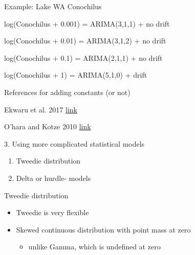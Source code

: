 \documentclass[ignorenonframetext,]{beamer}
\providecommand{\tightlist}{%
  \setlength{\itemsep}{0pt}\setlength{\parskip}{0pt}}
\begin{document}
\begin{frame}{Example: Lake WA Conochilus}

log(Conochilus + 0.001) = ARIMA(3,1,1) + no drift

log(Conochilus + 0.01) = ARIMA(3,1,2) + no drift

log(Conochilus + 0.1) = ARIMA(2,1,1) + no drift

log(Conochilus + 1) = ARIMA(5,1,0) + drift

\end{frame}

\begin{frame}{References for adding constants (or not)}

Ekwaru et al. 2017
\href{https://amstat.tandfonline.com/doi/abs/10.1080/19466315.2017.1369900?journalCode=usbr20\#.XIe-RBNKiM4}{link}

O'hara and Kotze 2010
\href{https://besjournals.onlinelibrary.wiley.com/doi/full/10.1111/j.2041-210X.2010.00021.x}{link}

\end{frame}

\begin{frame}{3. Using more complicated statistical models}

\begin{enumerate}
\def\labelenumi{\arabic{enumi}.}
\item
  Tweedie distribution
\item
  Delta or hurdle- models
\end{enumerate}

\end{frame}

\begin{frame}{Tweedie distribution}

\begin{itemize}
\item
  Tweedie is very flexible
\item
  Skewed continuous distribution with point mass at zero

  \begin{itemize}
  \tightlist
  \item
    unlike Gamma, which is undefined at zero
  \end{itemize}
\end{itemize}

\end{frame}
\end{document}
